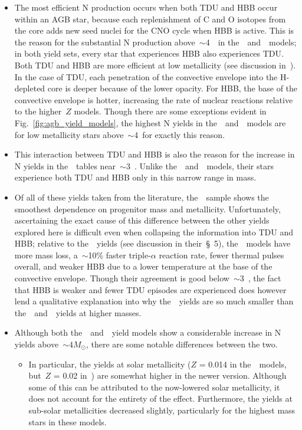 \documentclass[ms.tex]{subfiles}
\begin{document}
\begin{itemize}
	\item The most efficient N production occurs when both TDU and HBB 
	occur within an AGB star, because each replenishment of C and O 
	isotopes from the core adds new seed nuclei for the CNO cycle when HBB 
	is active. 
	This is the reason for the substantial N production 
	above~$\sim$4~\msun~in the~\karakasten~and~\karakas~models; in both 
	yield sets, every star that experiences HBB also experiences TDU. 
	Both TDU and HBB are more efficient at low metallicity (see discussion 
	in~\ventura). 
	In the case of TDU, each penetration of the convective envelope into 
	the H-depleted core is deeper because of the lower opacity. 
	For HBB, the base of the convective envelope is hotter, increasing the 
	rate of nuclear reactions relative to the higher~$Z$ models. 
	Though there are some exceptions evident in Fig.~\ref{fig:agb_yield_models}, 
	the highest N yields in the~\karakasten~and~\karakas~models are for low 
	metallicity stars above~$\sim$4~\msun for exactly this reason. 

	\item This interaction between TDU and HBB is also the reason for the 
	increase in N yields in the~\ventura~tables near~$\sim$3~\msun. 
	Unlike the~\karakasten~and~\karakas~models, their stars experience 
	both TDU and HBB only in this narrow range in mass. 

	\item Of all of these yields taken from the literature, 
	the~\cristallo~sample shows the smoothest dependence on progenitor mass 
	and metallicity. 
	Unfortunately, ascertaining the exact cause of this difference between 
	the other yields explored here is difficult even when collapsing the 
	information into TDU and HBB; relative to the~\karakas~yields (see 
	discussion in their~\S~5), the~\cristallo~models have more mass loss, 
	a~$\sim$10\% faster triple-$\alpha$ reaction rate, fewer thermal pulses 
	overall, and weaker HBB due to a lower temperature at the base of the 
	convective envelope. 
	Though their agreement is good below~$\sim$3~\msun, the fact that 
	HBB is weaker and fewer TDU episodes are experienced does however lend 
	a qualitative explanation into why the~\cristallo~yields are so much 
	smaller than the~\karakasten~and~\karakas~yields at higher masses. 

	\item Although both the~\karakas~and~\karakasten~yield models show a
	considerable increase in N yields above~$\sim 4 M_\odot$, there are some
	notable differences between the two.
	\begin{itemize}
		\item In particular, the yields at solar metallicity ($Z$ = 0.014 in
		the~\karakas~models, but~$Z$ = 0.02 in~\karakasten) are somewhat
		higher in the newer version.
		Although some of this can be attributed to the now-lowered solar
		metallicity, it does not account for the entirety of the effect.
		Furthermore, the yields at sub-solar metallicities decreased slightly,
		particularly for the highest mass stars in these models.


\end{itemize}
\end{itemize}
\end{document}
